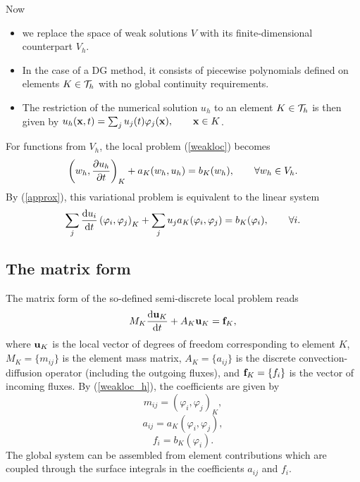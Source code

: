 \documentclass[mathserif]{beamer}
\begin{document}
\begin{frame}
Now
\begin{itemize}
\item we replace the space of weak solutions $V$ with its finite-dimensional counterpart $V_h$.
\item In the case of a DG method, it consists of piecewise polynomials defined on elements $K\in {\cal T}_h$ with no global continuity requirements. 
\item The restriction of the numerical solution $u_h$ to an element $K\in {\cal T}_h$ is then given by $u_h(\mathbf{x},t)=\sum_ju_j(t)\varphi_j(\mathbf{x}),\qquad\mathbf{x} \in K\label{approx}$.
\end{itemize}
For functions from $V_h$, the local problem (\ref{weakloc}) becomes 
\begin{equation}
\left(w_h,\frac{\partial u_h}{\partial t}\right)_K+a_K(w_h,u_h)=b_K(w_h),\qquad 
\forall w_h\in V_h.
\label{weakloc2}
\end{equation}
By (\ref{approx}), this variational problem is equivalent to the linear system
\begin{equation}
\sum_j\frac{\mathrm{d} u_i}{\mathrm{d} t}
\left(\varphi_i,\varphi_j\right)_K
+\sum_ju_ja_K(\varphi_i,\varphi_j)=
b_K(\varphi_i),\qquad \forall i.
\label{weakloc_h}
\end{equation}
\end{frame}



\subsection{The matrix form}
\begin{frame}

The matrix form of the so-defined semi-discrete 
local problem reads
\begin{equation}
M_K\frac{\mathrm{d} \mathbf{u}_K}{\mathrm{d} t}+A_K \mathbf{u}_K=\mathbf{f}_K,\label{discrloc}
\end{equation}
where $\displaystyle \mathbf{u}_K$ is the local vector of degrees of freedom corresponding to element $K$, 
$\displaystyle M_K=\{m_{ij}\}$ is the element mass matrix, 
$\displaystyle A_K=\{a_{ij}\}$ is the discrete convection-diffusion operator 
(including the outgoing fluxes), and $\displaystyle \mathbf{f}_K=\{f_i\}$ is the vector of 
incoming fluxes. By (\ref{weakloc_h}), the coefficients are given by
\begin{equation}
m_{ij}=(\varphi_i,\varphi_j)_K,
\end{equation}
\begin{equation}
a_{ij}=a_K(\varphi_i,\varphi_j),
\end{equation}
\begin{equation}
f_i=b_K(\varphi_i).
\end{equation}
The global system can be assembled from element contributions which
are coupled through the surface integrals in the
coefficients $a_{ij}$ and $f_i$. 
\end{frame}
\end{document}
